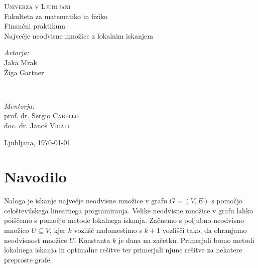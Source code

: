 \documentclass[a4paper, 12pt]{article}
\begin{document}
\begin{titlepage}
    \begin{center}
        \textsc{\LARGE Univerza v Ljubljani}\\[0.5cm]
        {\Large Fakulteta za matematiko in fiziko}\\[3cm]
        {\large Finančni praktikum}\\[0.5cm]
        {\huge Največje neodvisne množice z lokalnim iskanjem}\\[10.0cm]
    \end{center}

    \begin{minipage}{0.4\textwidth}
		\begin{flushleft}
			\large
			\textit{Avtorja:}\\
			Jaka Mrak \\
			Žiga Gartner 
		\end{flushleft}
	\end{minipage}
	~
	\begin{minipage}{0.4\textwidth}
		\begin{flushright}
			\large
			\textit{Mentorja:}\\
			prof. dr. Sergio \textsc{Cabello} \\
			doc. dr. Janoš \textsc{Vidali}
		\end{flushright}
	\end{minipage}
	
	\vfill\vfill\vfill 
	\begin{center}
	{\large{Ljubljana, \today}} 
    \end{center}
	\vfill 

\end{titlepage}

\tableofcontents

\newpage

\section{Navodilo}

Naloga je iskanje največje neodvisne množice v grafu $G = (V,E)$ s pomočjo celoštevilskega linearnega programiranja. Velike neodvisne množice v grafu lahko poiščemo s pomočjo metode lokalnega iskanja.
Začnemo s poljubno neodvisno množico $U  \subseteq V$, kjer $k$ vozlišč nadomestimo s $k + 1$ vozlišči tako, da ohranjamo neodvisnost množice $U$. Konstanta $k$ je dana na začetku. Primerjali bomo metodi
lokalnega iskanja in optimalne rešitve ter primerjali njune rešitve za nekatere preproste grafe.
\end{document}

